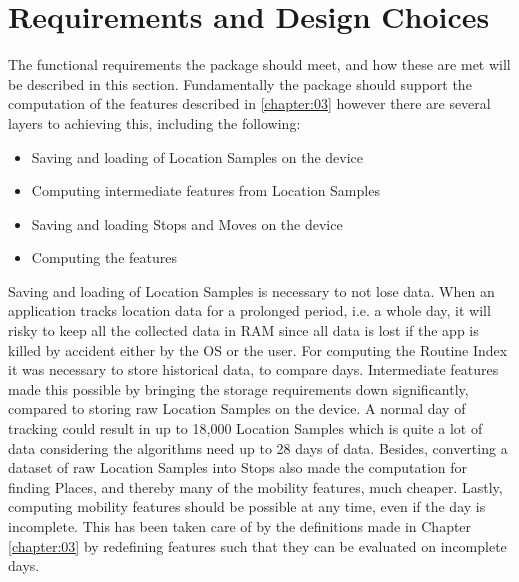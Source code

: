 \section{Requirements and Design Choices}
The functional requirements the package should meet, and how these are met will be described in this section. Fundamentally the package should support the computation of the features described in \ref{chapter:03} however there are several layers to achieving this, including the following:

\begin{itemize}
    \item Saving and loading of Location Samples on the device
    \item Computing intermediate features from Location Samples
    \item Saving and loading Stops and Moves on the device
    \item Computing the features
\end{itemize}

Saving and loading of Location Samples is necessary to not lose data. When an application tracks location data for a prolonged period, i.e. a whole day, it will risky to keep all the collected data in RAM since all data is lost if the app is killed by accident either by the OS or the user. For computing the Routine Index it was necessary to store historical data, to compare days. Intermediate features made this possible by bringing the storage requirements down significantly, compared to storing raw Location Samples on the device. A normal day of tracking could result in up to 18,000 Location Samples which is quite a lot of data considering the algorithms need up to 28 days of data. Besides, converting a dataset of raw Location Samples into Stops also made the computation for finding Places, and thereby many of the mobility features, much cheaper. Lastly, computing mobility features should be possible at any time, even if the day is incomplete. This has been taken care of by the definitions made in Chapter \ref{chapter:03} by redefining features such that they can be evaluated on incomplete days.

